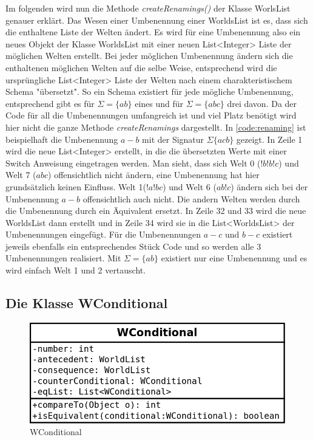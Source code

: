 \documentclass[12pt,a4paper]{article}
\begin{document}
Im folgenden wird nun die Methode \textit{createRenamings()} der Klasse WorlsList genauer erklärt. Das Wesen einer Umbenennung einer WorldsList ist es, dass sich die enthaltene Liste der Welten ändert. Es wird für eine Umbenennung also ein neues Objekt der Klasse WorldsList mit einer neuen List<Integer> Liste der möglichen Welten erstellt. Bei jeder möglichen Umbenennung ändern sich die enthaltenen möglichen Welten auf die selbe Weise, entsprechend wird die ursprüngliche List<Integer> Liste der Welten nach einem charakteristischem Schema "übersetzt". So ein Schema existiert für jede mögliche Umbenennung, entsprechend gibt es für $\Sigma=\{ab\}$ eines und für $\Sigma=\{abc\}$ drei davon. Da der Code für all die Umbenennungen umfangreich ist und viel Platz benötigt wird hier nicht die ganze Methode \textit{createRenamings} dargestellt. In \ref{code:renaming} ist beispielhaft die Umbenennung $a-b$ mit der Signatur $\Sigma\{acb\}$ gezeigt. In Zeile 1 wird die neue List<Integer> erstellt, in die die übersetzten Werte mit einer Switch Anweisung eingetragen werden. Man sieht, dass sich  Welt 0 ($!b!b!c$) und Welt 7 ($abc$) offensichtlich nicht ändern, eine Umbenennung hat hier grundsätzlich keinen Einfluss. Welt 1($!a!bc$) und Welt 6 ($ab!c$) ändern sich bei der Umbenennung $a-b$ offensichtlich auch nicht. Die andern Welten werden durch die Umbenennung durch ein Äquivalent ersetzt. In Zeile 32 und 33 wird die neue WorldsList dann erstellt und in Zeile 34 wird sie in die List<WorldsList> der Umbenennungen eingefügt.  Für die Umbenennungen $a-c$ und $b-c$ existiert jeweils ebenfalls ein entsprechendes Stück Code und so werden alle 3 Umbenennungen realisiert. Mit $ \Sigma=\{ab\}$ existiert nur eine Umbenennung und es wird einfach Welt 1 und 2 vertauscht.




\subsection{Die Klasse WConditional}

\begin{figure}
\includegraphics[width=0.45\linewidth]{bilder/wconditional.png}
\caption{WConditional}
\label{pic:wconditional}
\end{figure}
\end{document}
